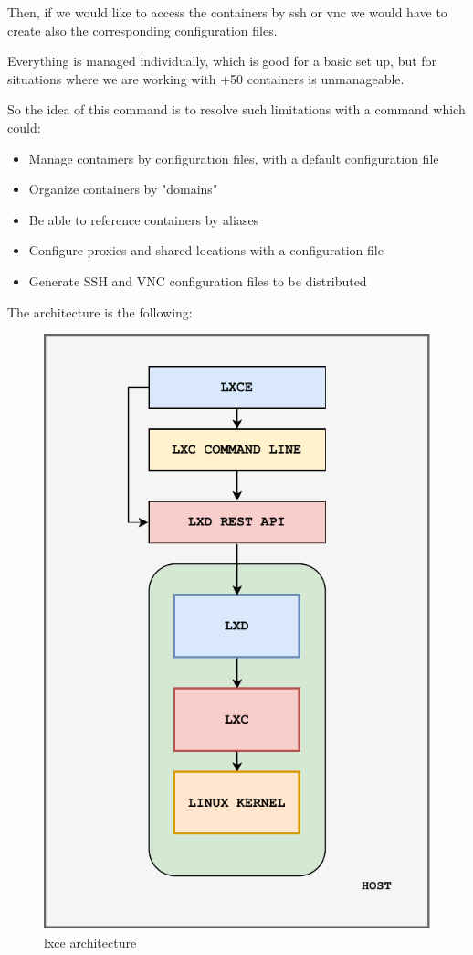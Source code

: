 Then, if we would like to access the containers by ssh or vnc we would have to create also the corresponding configuration files.

Everything is managed individually, which is good for a basic set up, but for situations where we are working with +50 containers is unmanageable. 

So the idea of this command is to resolve such limitations with a command which could:
\begin{itemize}
	\item{Manage containers by configuration files, with a default configuration file}
	\item{Organize containers by "domains"}
	\item{Be able to reference containers by aliases}
	\item{Configure proxies and shared locations with a configuration file}
	\item{Generate SSH and VNC configuration files to be distributed}
\end{itemize}

The architecture is the following:
\begin{figure}[H]
	\label{fig:LXCE architecture}
	\centering
	\includegraphics{img/03/lxce-diagram.pdf}
	\caption[LXCE block diagram]{\footnotesize{lxce architecture}}
\end{figure}

